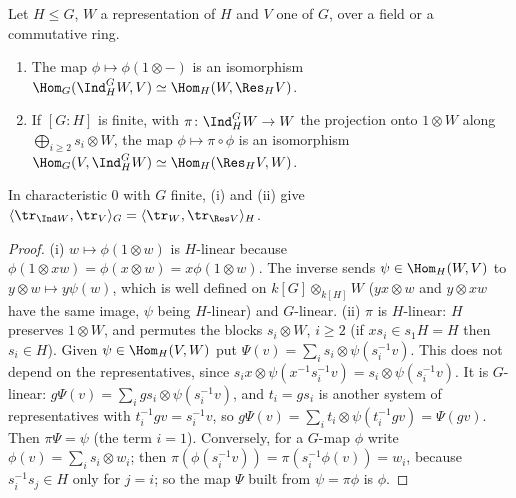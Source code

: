 \begin{theorem}\label{thm:reps:frobenius-reciprocity}
Let $H\le G$, $W$ a representation of $H$ and $V$ one of $G$, over a field or a commutative ring.
\begin{enumerate}[label=(\roman*)]
\item The map $\phi\mapsto\phi(1\otimes{-})$ is an isomorphism $\Hom_G(\Ind_H^GW,V)\simeq\Hom_H(W,\Res_HV)$.
\item If $[G:H]$ is finite, with $\pi\colon\Ind_H^GW\to W$ the projection onto $1\otimes W$ along $\bigoplus_{i\ge2}s_i\otimes W$, the map $\phi\mapsto\pi\circ\phi$ is an
isomorphism $\Hom_G(V,\Ind_H^GW)\simeq\Hom_H(\Res_HV,W)$.
\end{enumerate}
In characteristic $0$ with $G$ finite, (i) and (ii) give $\langle\tr_{\Ind W},\tr_V\rangle_G=\langle\tr_W,\tr_{\Res V}\rangle_H$.
\end{theorem}

\begin{proof}
(i) $w\mapsto\phi(1\otimes w)$ is $H$-linear because $\phi(1\otimes xw)=\phi(x\otimes w)=x\phi(1\otimes w)$. The inverse sends $\psi\in\Hom_H(W,V)$ to
$y\otimes w\mapsto y\psi(w)$, which is well defined on $k[G]\otimes_{k[H]}W$ ($yx\otimes w$ and $y\otimes xw$ have the same image, $\psi$ being $H$-linear) and
$G$-linear.
(ii) $\pi$ is $H$-linear: $H$ preserves $1\otimes W$, and permutes the blocks $s_i\otimes W$, $i\ge2$ (if $xs_i\in s_1H=H$ then $s_i\in H$). Given $\psi\in
\Hom_H(V,W)$ put $\Psi(v)=\sum_is_i\otimes\psi(s_i^{-1}v)$. This does not depend on the representatives, since $s_ix\otimes\psi(x^{-1}s_i^{-1}v)=s_i\otimes\psi(s_i^{-1}v)$.
It is $G$-linear: $g\Psi(v)=\sum_igs_i\otimes\psi(s_i^{-1}v)$, and $t_i=gs_i$ is another system of representatives with $t_i^{-1}gv=s_i^{-1}v$, so
$g\Psi(v)=\sum_it_i\otimes\psi(t_i^{-1}gv)=\Psi(gv)$. Then $\pi\Psi=\psi$ (the term $i=1$). Conversely, for a $G$-map $\phi$ write $\phi(v)=\sum_is_i\otimes w_i$;
then $\pi(\phi(s_i^{-1}v))=\pi(s_i^{-1}\phi(v))=w_i$, because $s_i^{-1}s_j\in H$ only for $j=i$; so the map $\Psi$ built from $\psi=\pi\phi$ is $\phi$.
\end{proof}

